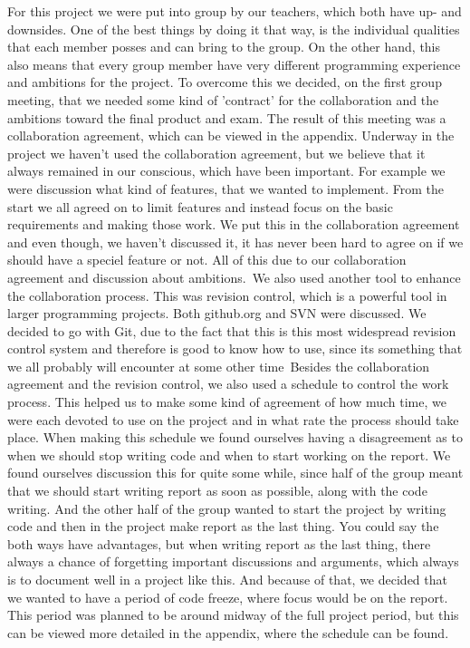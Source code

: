 \documentclass[a4paper,10pt,titlepage]{article}
\begin{document}
		For this project we were put into group by our teachers, which both have up- and downsides. One of the best things by doing it that way, is the individual qualities that each member posses and can bring to the group. On the other hand, this also means that every group member have very different programming experience and ambitions for the project. To overcome this we decided, on the first group meeting, that we needed some kind of 'contract' for the collaboration and the ambitions toward the final product and exam. The result of this meeting was a collaboration agreement, which can be viewed in the appendix. Underway in the project we haven't used the collaboration agreement, but we believe that it always remained in our conscious, which have been important. For example we were discussion what kind of features, that we wanted to implement. From the start we all agreed on to limit features and instead focus on the basic requirements and making those work. We put this in the collaboration agreement and even though, we haven't discussed it, it has never been hard to agree on if we should have a speciel feature or not. All of this due to our collaboration agreement and discussion about ambitions.\
		We also used another tool to enhance the collaboration process. This was revision control, which is a powerful tool in larger programming projects. Both github.org and SVN were discussed. We decided to go with Git, due to the fact that this is this most widespread revision control system and therefore is good to know how to use, since its something that we all probably will encounter at some other time\
		Besides the collaboration agreement and the revision control, we also used a schedule to control the work process. This helped us to make some kind of agreement of how much time, we were each devoted to use on the project and in what rate the process should take place. When making this schedule we found ourselves having a disagreement as to when we should stop writing code and when to start working on the report. We found ourselves discussion this for quite some while, since half of the group meant that we should start writing report as soon as possible, along with the code writing. And the other half of the group wanted to start the project by writing code and then in the project make report as the last thing. You could say the both ways have advantages, but when writing report as the last thing, there always a chance of forgetting important discussions and arguments, which always is to document well in a project like this. And because of that, we decided that we wanted to have a period of code freeze, where focus would be on the report. This period was planned to be around midway of the full project period, but this can be viewed more detailed in the appendix, where the schedule can be found.
\end{document}
